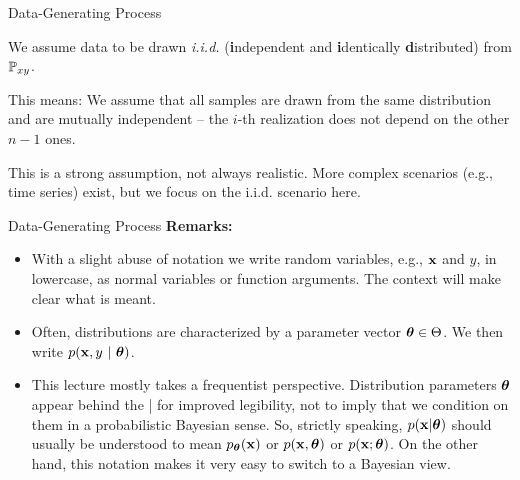 \documentclass[11pt,compress,t,notes=noshow, xcolor=table]{beamer}
\begin{document}
\begin{framei}{Data-Generating Process}
\item We assume data to be drawn \emph{i.i.d.} (\textbf{i}ndependent and \textbf{i}dentically \textbf{d}istributed) from $\mathbb{P}_{xy}$.
\item This means: We assume that all samples are drawn from the same distribution and are mutually independent -- the $i$-th realization does not depend on the other $n-1$ ones.
\item This is a strong assumption, not always realistic.
More complex scenarios (e.g., time series) exist, but we focus on the i.i.d. scenario here. 
\vfill
{}
\end{framei}


\begin{frame2}{Data-Generating Process}
\textbf{Remarks:}
\begin{itemize}
\item With a slight abuse of notation we write random variables, e.g., $\mathbf{x}$ and $y$, in lowercase, as normal variables or function arguments. 
The context will make clear what is meant.
\item Often, distributions are characterized by a parameter vector $\bm{\theta} \in \Theta$. We then write $p(\mathbf{x}, y ~|~ \bm{\theta})$.
\item This lecture mostly takes a frequentist perspective. Distribution parameters $\bm{\theta}$ appear behind the | for improved legibility, not to imply that we condition on them in a probabilistic Bayesian sense.
So, strictly speaking, $p(\mathbf{x} | \bm{\theta})$ should usually be understood to mean $p_{\bm{\theta}}(\mathbf{x})$ or $p(\mathbf{x}, \bm{\theta})$ or $p(\mathbf{x}; \bm{\theta})$.
On the other hand, this notation makes it very easy to switch to a Bayesian view.
\end{itemize}
\end{frame2}

\endlecture
\end{document}
